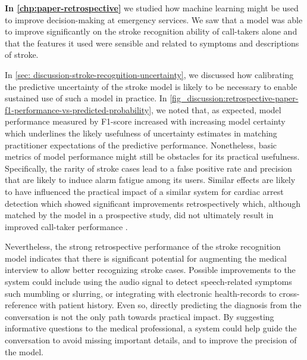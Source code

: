 \vspace{1em}
\textbf{In \cref{chp:paper-retrospective}} we studied how machine learning might be used to improve decision-making at emergency services. 
We saw that a model was able to improve significantly on the stroke recognition ability of call-takers alone and that the features it used were sensible and related to symptoms and descriptions of stroke. 

In \cref{sec: discussion-stroke-recognition-uncertainty}, we discussed how calibrating the predictive uncertainty of the stroke model is likely to be necessary to enable sustained use of such a model in practice. In \cref{fig_discussion:retrospective-paper-f1-performance-vs-predicted-probability}, we noted that, as expected, model performance measured by F1-score increased with increasing model certainty which underlines the likely usefulness of uncertainty estimates in matching practitioner expectations of the predictive performance. 
Nonetheless, basic metrics of model performance might still be obstacles for its practical usefulness. Specifically, the rarity of stroke cases lead to a false positive rate and precision that are likely to induce alarm fatigue among its users. Similar effects are likely to have influenced the practical impact of a similar system for cardiac arrest detection which showed significant improvements retrospectively \parencite{cite14} which, although matched by the model in a prospective study, did not ultimately result in improved call-taker performance \parencite{cite15}. 

Nevertheless, the strong retrospective performance of the stroke recognition model indicates that there is significant potential for augmenting the medical interview to allow better recognizing stroke cases. 
Possible improvements to the system could include using the audio signal to detect speech-related symptoms such mumbling or slurring, or integrating with electronic health-records to cross-reference with patient history. 
Even so, directly predicting the diagnosis from the conversation is not the only path towards practical impact. By suggesting informative questions to the medical professional, a system could help guide the conversation to avoid missing important details, and to improve the precision of the model. 





